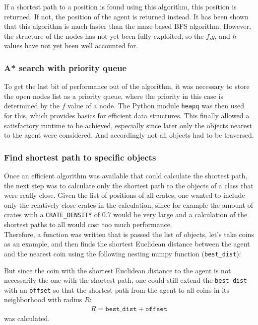 If a shortest path to a position is found using this algorithm, this position is returned. If not, the position of the agent is returned instead. It has been shown that this algorithm is much faster than the maze-based BFS algorithm. However, the structure of the nodes has not yet been fully exploited, so the $f$,$g$, and $h$ values have not yet been well accounted for.

\subsubsection*{A* search with priority queue}
To get the last bit of performance out of the algorithm, it was necessary to store the open nodes list as a priority queue, where the priority in this case is determined by the $f$ value of a node. The Python module \texttt{heapq} was then used for this, which provides basics for efficient data structures. This finally allowed a satisfactory runtime to be achieved, especially since later only the objects nearest to the agent were considered. And accordingly not all objects had to be traversed.

\subsubsection*{Find shortest path to specific objects}
Once an efficient algorithm was available that could calculate the shortest path, the next step was to calculate only the shortest path to the objects of a class that were really close. Given the list of positions of all crates, one wanted to include only the relatively close crates in the calculation, since for example the amount of crates with a \texttt{CRATE\_DENSITY} of $0.7$ would be very large and a calculation of the shortest paths to all would cost too much performance. 
\\

Therefore, a function was written that is passed the list of objects, let's take coins as an example, and then finds the shortest Euclidean distance between the agent and the nearest coin using the following nesting numpy function (\texttt{best\_dist}):
\vspace{0.1cm}

\vspace{0.1cm}
But since the coin with the shortest Euclidean distance to the agent is not necessarily the one with the shortest path, one could still extend the \texttt{best\_dist} with an \texttt{offset} so that the shortest path from the agent to all coins in its neighborhood with radius $R$:
\begin{align*}
R = \texttt{best\_dist} + \texttt{offset}
\end{align*}
was calculated.
\\

